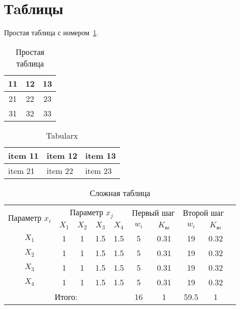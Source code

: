 \section{Тaблицы}

Простая таблица с номером~\ref{tab:simple}.

\begin{table}[H]
\caption{Простая таблица}\label{tab:simple}
\begin{tabular}{|c|c|c|}
    \hline
    11 & 12 & 13\\\hline
    21 & 22 & 23\\\hline
    31 & 32 & 33\\\hline
\end{tabular}
\end{table}

\begin{table}[H]
\caption{Tabularx}\label{tab:x}
\begin{tabularx}{0.8\textwidth} { 
  | >{\raggedright\arraybackslash}X 
  | >{\centering\arraybackslash}X 
  | >{\raggedleft\arraybackslash}X | }
 \hline
     item 11 & item 12 & item 13\\\hline
     item 21  & item 22  & item 23\\\hline
\end{tabularx}
\end{table}

\begin{table}[H]
    \caption{Сложная таблица}\label{tab:hd}
\begin{tabular}{|*{10}{c|}}
    \hline
    \multirow{2}{*}{Параметр \(x_i\)} &
    \multicolumn{4}{c|}{Параметр \(x_j\)} &
    \multicolumn{2}{c|}{Первый шаг} &
    \multicolumn{2}{c|}{Второй шаг}\\\cline{2-9} &
    \(X_1\) & \(X_2\) & \(X_3\) & \(X_4\) & 
    \(w_i\) & \(K_{\text{в}i}\) &
    \(w_i\) & \(K_{\text{в}i}\)\\\hline
    \(X_1\) & 1 & 1 & 1.5 & 1.5 & 5 & 0.31 & 19 & 0.32\\\hline
    \(X_2\) & 1 & 1 & 1.5 & 1.5 & 5 & 0.31 & 19 & 0.32\\\hline
    \(X_3\) & 1 & 1 & 1.5 & 1.5 & 5 & 0.31 & 19 & 0.32\\\hline
    \(X_4\) & 1 & 1 & 1.5 & 1.5 & 5 & 0.31 & 19 & 0.32\\\hline
    \multicolumn{5}{|c|}{Итого:} & 16 & 1 & 59.5 & 1\\\hline
\end{tabular}
\end{table}

